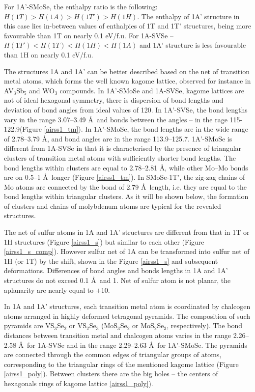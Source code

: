 \documentclass[a4paperm]{article}
\begin{document}
For 1A'-SMoSe, the enthalpy ratio is the following: $H(1T) > H(1A) > H(1T') > H(1H)$.
The enthalpy of 1A' structure in this case lies in-between values of enthalpies of 1T and 1T' structures, being more favourable than 1T on nearly 0.1 eV/f.u.
For 1A-SVSe -- $H(1T') < H(1T) < H(1H) < H(1A)$ and 1A' structure is less favourable than 1H on nearly 0.1 eV/f.u.


The structures 1A and 1A' can be better described based on the net of transition metal atoms, which forms the well known kagome lattice\cite{zhang2021_kagome}, observed for instance in AV$_3$Sb$_5$ \cite{ortiz2021} and WO$_3$ \cite{gerand1979} compounds.
In 1A'-SMoSe and 1A-SVSe, kagome lattices are not of ideal hexagonal symmetry, there is dispersion of bond lengths and deviation of bond angles from ideal values of 120\textdegree.
In 1A'-SVSe, the bond lengths vary in the range 3.07--3.49 \AA\ and bonds between the angles – in the rage 115-122.9\textdegree (Figure \ref{airss1_tm}).
In 1A'-SMoSe, the bond lengths are in the wide range of 2.78--3.79 \AA, and bond angles are in the range 113.9--125.7\textdegree.
1A'-SMoSe is different from 1A-SVSe in that it is characterised by the presence of triangular clusters of transition metal atoms with sufficiently shorter bond lengths.
The bond lengths within clusters are equal to 2.78--2.81 \AA, while other Mo--Mo bonds are on 0.5--1 \AA\ longer (Figure \ref{airss1_tm}).
In SMoSe-1T', the zig-zag chains of Mo atoms are connected by the bond of 2.79 \AA\ length, i.e. they are equal to the bond lengths within triangular clusters.
As it will be shown below, the formation of clusters and chains of molybdenum atoms are typical for the revealed structures.




The net of sulfur atoms in 1A and 1A' structures are different from that in 1T or 1H structures (Figure \ref{airss1_s}) but similar to each other (Figure \ref{airss1_s_comp}).
However sulfur net of 1A can be transformed into sulfur net of 1H (or 1T) by the shift, shown in the Figure \ref{airss1_s} and subsequent deformations.
Differences of bond angles and bonds lengths in 1A and 1A' structures do not exceed 0.1 \AA\ and 1\textdegree.
Net of sulfur atom is not planar, the aplanarity are nearly equal to $\pm$10\textdegree.

In 1A and 1A' structures, each transition metal atom is coordinated by  chalcogen atoms arranged in highly deformed tetragonal pyramids.
The composition of such pyramids are VS$_3$Se$_2$ or VS$_2$Se$_3$ (MoS$_3$Se$_2$ or MoS$_2$Se$_3$, respectively).
The bond distances between transition metal and chalcogen atoms varies in the range 2.26--2.58 \AA\ for 1A-SVSe and in the range 2.29--2.63 \AA\ for 1A'-SMoSe.
The pyramids are connected through the common edges of triangular groups of atoms, corresponding to the triangular rings of the mentioned kagome lattice (Figure \ref{airss1_poly}).
Between clusters there are the big holes -- the centers of hexagonals rings of kagome lattice \ref{airss1_poly}).
\end{document}
